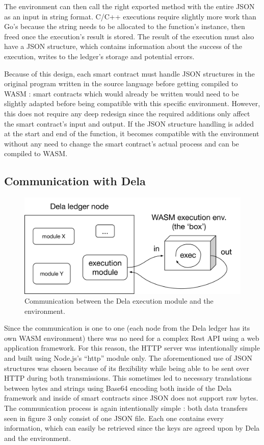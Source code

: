 \documentclass[11pt, a4paper, twoside, openright]{article}
\begin{document}
The environment can then call the right exported method with the entire JSON as an input in string format. C/C++ executions require slightly more work than Go's because the string needs to be allocated to the function's instance, then freed once the execution's result is stored. The result of the execution must also have a JSON structure, which contains information about the success of the execution, writes to the ledger's storage and potential errors.

Because of this design, each smart contract must handle JSON structures in the original program written in the source language before getting compiled to WASM : smart contracts which would already be written would need to be slightly adapted before being compatible with this specific environment. However, this does not require any deep redesign since the required additions only affect the smart contract's input and output. If the JSON structure handling is added at the start and end of the function, it becomes compatible with the environment without any need to change the smart contract's actual process and can be compiled to WASM.

\subsection{Communication with Dela}

\begin{figure}[htbp]
 \centering
  \includegraphics[width=12cm]{wasm3.png}
  \caption{Communication between the Dela execution module and the environment.}
\end{figure}

Since the communication is one to one (each node from the Dela ledger has its own WASM environment) there was no need for a complex Rest API using a web application framework. For this reason, the HTTP server was intentionally simple and built using Node.js's ``http'' module only. The aforementioned use of JSON structures was chosen because of its flexibility while being able to be sent over HTTP during both transmissions. This sometimes led to necessary translations between bytes and strings using Base64 encoding both inside of the Dela framework and inside of smart contracts since JSON does not support raw bytes. The communication process is again intentionally simple : both data transfers seen in figure 3 only consist of one JSON file. Each one contains every information, which can easily be retrieved since the keys are agreed upon by Dela and the environment.
\end{document}
